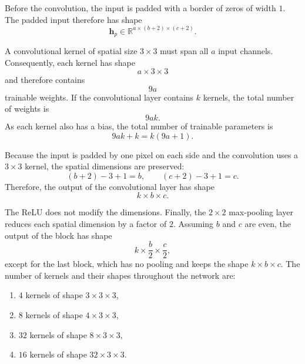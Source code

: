 \documentclass[11pt, a4paper]{exam}
\begin{document}
\begin{exercises}
\begin{parts}
\begin{solution}
        Before the convolution, the input is padded with a border of zeros of width $1$. The padded input therefore has shape
        \[
            \mathbf{h}_p \in \mathbb{R}^{a\times(b+2)\times(c+2)}.
        \]

        A convolutional kernel of spatial size $3\times3$ must span all $a$ input channels. Consequently, each kernel has shape
        \[
            a\times3\times3
        \]
        and therefore contains
        \[
            9a
        \]
        trainable weights. If the convolutional layer contains $k$ kernels, the total number of weights is
        \[
            \boxed{9ak}.
        \]
        As each kernel also has a bias, the total number of trainable parameters is
        \[
            \boxed{9ak+k=k(9a+1)}.
        \]

        Because the input is padded by one pixel on each side and the convolution uses a $3\times3$ kernel, the spatial dimensions are preserved:
        \[
            (b+2)-3+1=b,
            \qquad
            (c+2)-3+1=c.
        \]
        Therefore, the output of the convolutional layer has shape
        \[
            k\times b\times c.
        \]

        The ReLU does not modify the dimensions. Finally, the $2\times2$ max-pooling layer reduces each spatial dimension by a factor of $2$. Assuming $b$ and $c$ are even, the output of the block has shape
        \[
            \boxed{k\times\frac{b}{2}\times\frac{c}{2}},
        \]
        except for the last block, which has no pooling and keeps the shape $k \times b \times c$.
        The number of kernels and their shapes throughout the network are:
        \begin{enumerate}
            \item $4$ kernels of shape $3\times3\times3$,
            \item $8$ kernels of shape $4\times3\times3$,
            \item $32$ kernels of shape $8\times3\times3$,
            \item $16$ kernels of shape $32\times3\times3$.
        \end{enumerate}


\end{solution}
\end{parts}
\end{exercises}
\end{document}
